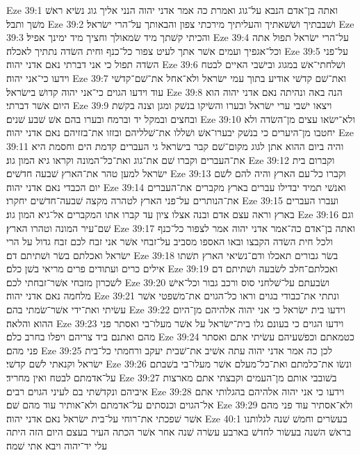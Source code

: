 Eze 39:1  ואתה בן־אדם הנבא על־גוג ואמרת כה אמר אדני יהוה הנני אליך גוג נשׂיא ראשׁ משׁך ותבל׃
Eze 39:2  ושׁבבתיך ושׁשׁאתיך והעליתיך מירכתי צפון והבאותך על־הרי ישׂראל׃
Eze 39:3  והכיתי קשׁתך מיד שׂמאולך וחציך מיד ימינך אפיל׃
Eze 39:4  על־הרי ישׂראל תפול אתה וכל־אגפיך ועמים אשׁר אתך לעיט צפור כל־כנף וחית השׂדה נתתיך לאכלה׃
Eze 39:5  על־פני השׂדה תפול כי אני דברתי נאם אדני יהוה׃
Eze 39:6  ושׁלחתי־אשׁ במגוג ובישׁבי האיים לבטח וידעו כי־אני יהוה׃
Eze 39:7  ואת־שׁם קדשׁי אודיע בתוך עמי ישׂראל ולא־אחל את־שׁם־קדשׁי עוד וידעו הגוים כי־אני יהוה קדושׁ בישׂראל׃
Eze 39:8  הנה באה ונהיתה נאם אדני יהוה הוא היום אשׁר דברתי׃
Eze 39:9  ויצאו ישׁבי ערי ישׂראל ובערו והשׂיקו בנשׁק ומגן וצנה בקשׁת ובחצים ובמקל יד וברמח ובערו בהם אשׁ שׁבע שׁנים׃
Eze 39:10  ולא־ישׂאו עצים מן־השׂדה ולא יחטבו מן־היערים כי בנשׁק יבערו־אשׁ ושׁללו את־שׁלליהם ובזזו את־בזזיהם נאם אדני יהוה׃
Eze 39:11  והיה ביום ההוא אתן לגוג מקום־שׁם קבר בישׂראל גי העברים קדמת הים וחסמת היא את־העברים וקברו שׁם את־גוג ואת־כל־המונה וקראו גיא המון גוג׃
Eze 39:12  וקברום בית ישׂראל למען טהר את־הארץ שׁבעה חדשׁים׃
Eze 39:13  וקברו כל־עם הארץ והיה להם לשׁם יום הכבדי נאם אדני יהוה׃
Eze 39:14  ואנשׁי תמיד יבדילו עברים בארץ מקברים את־העברים את־הנותרים על־פני הארץ לטהרה מקצה שׁבעה־חדשׁים יחקרו׃
Eze 39:15  ועברו העברים בארץ וראה עצם אדם ובנה אצלו ציון עד קברו אתו המקברים אל־גיא המון גוג׃
Eze 39:16  וגם שׁם־עיר המונה וטהרו הארץ׃
Eze 39:17  ואתה בן־אדם כה־אמר אדני יהוה אמר לצפור כל־כנף ולכל חית השׂדה הקבצו ובאו האספו מסביב על־זבחי אשׁר אני זבח לכם זבח גדול על הרי ישׂראל ואכלתם בשׂר ושׁתיתם דם׃
Eze 39:18  בשׂר גבורים תאכלו ודם־נשׂיאי הארץ תשׁתו אילים כרים ועתודים פרים מריאי בשׁן כלם׃
Eze 39:19  ואכלתם־חלב לשׂבעה ושׁתיתם דם לשׁכרון מזבחי אשׁר־זבחתי לכם׃
Eze 39:20  ושׂבעתם על־שׁלחני סוס ורכב גבור וכל־אישׁ מלחמה נאם אדני יהוה׃
Eze 39:21  ונתתי את־כבודי בגוים וראו כל־הגוים את־משׁפטי אשׁר עשׂיתי ואת־ידי אשׁר־שׂמתי בהם׃
Eze 39:22  וידעו בית ישׂראל כי אני יהוה אלהיהם מן־היום ההוא והלאה׃
Eze 39:23  וידעו הגוים כי בעונם גלו בית־ישׂראל על אשׁר מעלו־בי ואסתר פני מהם ואתנם ביד צריהם ויפלו בחרב כלם׃
Eze 39:24  כטמאתם וכפשׁעיהם עשׂיתי אתם ואסתר פני מהם׃
Eze 39:25  לכן כה אמר אדני יהוה עתה אשׁיב את־שׁבית יעקב ורחמתי כל־בית ישׂראל וקנאתי לשׁם קדשׁי׃
Eze 39:26  ונשׂו את־כלמתם ואת־כל־מעלם אשׁר מעלו־בי בשׁבתם על־אדמתם לבטח ואין מחריד׃
Eze 39:27  בשׁובבי אותם מן־העמים וקבצתי אתם מארצות איביהם ונקדשׁתי בם לעיני הגוים רבים׃
Eze 39:28  וידעו כי אני יהוה אלהיהם בהגלותי אתם אל־הגוים וכנסתים על־אדמתם ולא־אותיר עוד מהם שׁם׃
Eze 39:29  ולא־אסתיר עוד פני מהם אשׁר שׁפכתי את־רוחי על־בית ישׂראל נאם אדני יהוה׃
Eze 40:1  בעשׂרים וחמשׁ שׁנה לגלותנו בראשׁ השׁנה בעשׂור לחדשׁ בארבע עשׂרה שׁנה אחר אשׁר הכתה העיר בעצם היום הזה היתה עלי יד־יהוה ויבא אתי שׁמה׃
